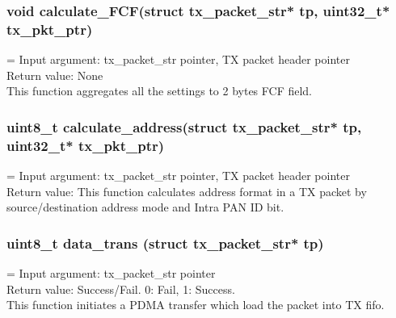 \subsubsection{void calculate\_FCF(struct tx\_packet\_str* tp, uint32\_t* tx\_pkt\_ptr)}
\hangindent=\parindent
{}
Input argument: tx\_packet\_str pointer, TX packet header pointer\\ 
Return value: None\\
This function aggregates all the settings to 2 bytes FCF field.

\subsubsection{uint8\_t calculate\_address(struct tx\_packet\_str* tp, uint32\_t* tx\_pkt\_ptr)}
\hangindent=\parindent
{}
Input argument: tx\_packet\_str pointer, TX packet header pointer\\ 
Return value: 
This function calculates address format in a TX packet by source/destination
address mode and Intra PAN ID bit.

\subsubsection{uint8\_t data\_trans (struct tx\_packet\_str* tp)}
\hangindent=\parindent
{}
Input argument: tx\_packet\_str pointer\\ 
Return value: Success/Fail. 0: Fail, 1: Success.\\
This function initiates a PDMA transfer which load the packet into TX fifo.
